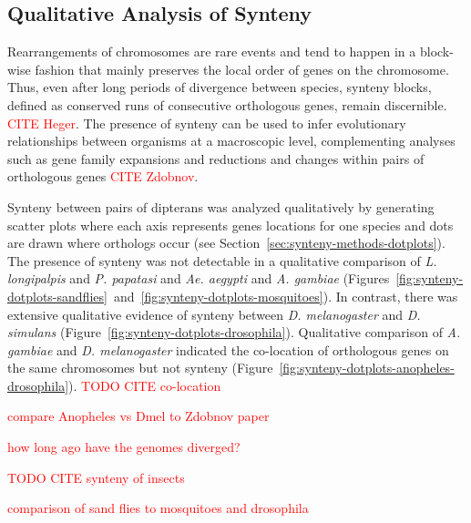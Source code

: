 \subsection{Qualitative Analysis of Synteny}
Rearrangements of chromosomes are rare events and tend to happen in a block-wise fashion that mainly preserves the local order of genes on the chromosome. Thus, even after long periods of divergence between species, synteny blocks, defined as conserved runs of consecutive orthologous genes, remain discernible. \textcolor{red}{CITE Heger}.  The presence of synteny can be used to infer evolutionary relationships between organisms at a macroscopic level, complementing analyses such as gene family expansions and reductions and changes within pairs of orthologous genes \textcolor{red}{CITE Zdobnov}.

Synteny between pairs of dipterans was analyzed qualitatively by generating scatter plots where each axis represents genes locations for one species and dots are drawn where orthologs occur (see Section~\ref{sec:synteny-methods-dotplots}). The presence of synteny was not detectable in a qualitative comparison of \emph{L. longipalpis} and \emph{P. papatasi} and \emph{Ae. aegypti} and \emph{A. gambiae} (Figures~\ref{fig:synteny-dotplots-sandflies}~and~\ref{fig:synteny-dotplots-mosquitoes}).  In contrast, there was extensive qualitative evidence of synteny between \emph{D. melanogaster} and \emph{D. simulans} (Figure~\ref{fig:synteny-dotplots-drosophila}).  Qualitative comparison of \emph{A. gambiae} and \emph{D. melanogaster} indicated the co-location of orthologous genes on the same chromosomes but not synteny (Figure~\ref{fig:synteny-dotplots-anopheles-drosophila}). \textcolor{red}{TODO CITE co-location}

\textcolor{red}{compare Anopheles vs Dmel to Zdobnov paper}

\textcolor{red}{how long ago have the genomes diverged?}

\textcolor{red}{TODO CITE synteny of insects}

\textcolor{red}{comparison of sand flies to mosquitoes and drosophila}

